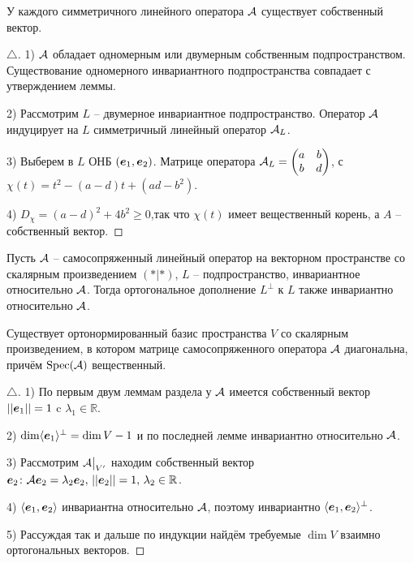  \begin{to_lem} 
 	 У каждого симметричного линейного оператора $\mathcal A$ существует собственный вектор.
 \end{to_lem}

 \begin{proof}[$\triangle$]
 	1) $\mathcal A$ обладает одномерным или двумерным собственным подпространством. Существование одномерного инвариантного подпространства совпадает с утверждением леммы.

 	2) Рассмотрим $L$ -- двумерное инвариантное подпространство. Оператор $\mathcal A$ индуцирует на $L$ симметричный линейный оператор $\mathcal A_L$.

 	3) Выберем в $L$ ОНБ $(\mbox{\boldmath $e$}_1, \mbox{\boldmath $e$}_2)$. Матрице оператора $\mathcal A_L = \begin{pmatrix}
 		a & b \\
 		b & d
 	\end{pmatrix}$,
 	с $\chi(t) = t^2 - (a -d) t + (a d - b^2)$.

 	4) $D_\chi = (a - d)^2 + 4 b^2 \geq 0$,так что $\chi(t)$ имеет вещественный корень, а $A$ -- собственный вектор.
 \end{proof}

 \begin{to_lem} 
 	 Пусть $\mathcal A$ -- самосопряженный линейный оператор на векторном пространстве со скалярным произведением $(*|*)$,  $L$ -- подпространство, инвариантное относительно $\mathcal A$. Тогда ортогональное дополнение $L^\bot$ к $L$ также инвариантно относительно $\mathcal A$.
 \end{to_lem}

 \begin{to_thr} 
 	Существует ортонормированный базис пространства $V$ со скалярным произведением, в котором матрице самосопряженного оператора $\mathcal A$ диагональна, причём $\text{Spec}(\mathcal A)$ вещественный.
 \end{to_thr}

 \begin{proof}[$\triangle$]
 	1) По первым двум леммам раздела у $\mathcal A$ имеется собственный вектор $||\mbox{\boldmath $e$}_1|| =1$ c $\lambda_1 \in \mathbb{R}$.

 	2) $\dim \langle \mbox{\boldmath $e$}_1\rangle^\bot = \dim V - 1$ и по последней лемме инвариантно относительно $\mathcal A$.

 	3) Рассмотрим $\mathcal A \big|_{V'}$ находим собственный вектор $\mbox{\boldmath $e$}_2 \colon \mathcal A \mbox{\boldmath $e$}_2 = \lambda_2 \mbox{\boldmath $e$}_2, \, ||\mbox{\boldmath $e$}_2|| = 1, \, \lambda_2 \in \mathbb{R}$.

 	4) $\langle \mbox{\boldmath $e$}_1, \mbox{\boldmath $e$}_2\rangle$ инвариантна относительно $\mathcal A$, поэтому инвариантно $\langle \mbox{\boldmath $e$}_1, \mbox{\boldmath $e$}_2\rangle^\bot$.

 	5) Рассуждая так и дальше по индукции найдём требуемые $\dim V$ взаимно ортогональных векторов.
 \end{proof}
